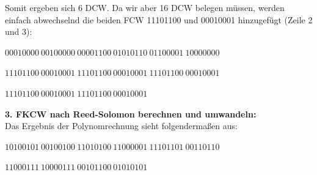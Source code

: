 Somit ergeben sich 6 DCW. Da wir aber 16 DCW belegen müssen, werden einfach abwechselnd die beiden FCW 11101100 und 00010001 hinzugefügt (Zeile 2 und 3):\\
\centerline{$00010000~00100000~00001100~01010110~01100001~10000000$}
\centerline{$11101100~00010001~11101100~00010001~11101100~00010001$}
\centerline{$11101100~00010001~11101100~00010001~~~~~~~~~~~~~~~~~~~~~~~~~~$}
 
\textbf{3. FKCW nach Reed-Solomon berechnen und umwandeln:}\\
Das Ergebnis der Polynomrechnung sieht folgendermaßen aus:\hfill \linebreak
\centerline{$10100101~00100100~11010100~11000001~11101101~00110110$}
\centerline{$11000111~10000111~00101100~01010101~~~~~~~~~~~~~~~~~~~~~~~~~~$}


\pagebreak
